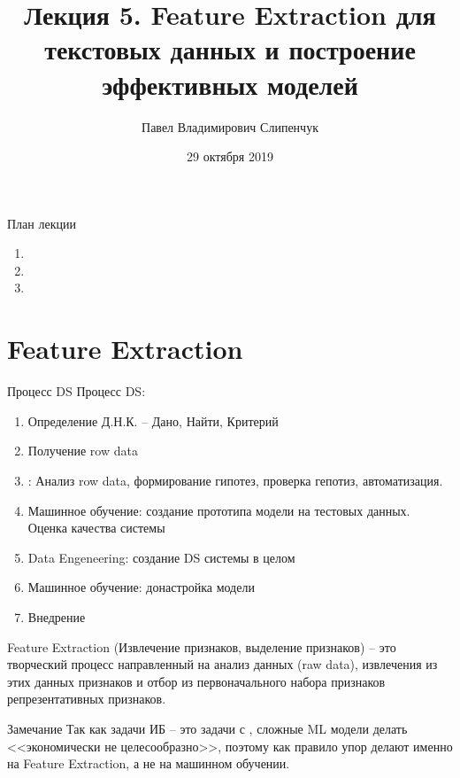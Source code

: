 


\title{Лекция 5. Feature Extraction для текстовых данных и построение эффективных моделей}

\date{29 октября 2019}
\author{Павел Владимирович Слипенчук }


  \maketitle
    
\begin{frame}{План лекции}
    \begin{enumerate}
    	\item {}
		\item {}
		\item {}
	\end{enumerate}
\end{frame}

\section{Feature Extraction}\label{section:fe}

\begin{frame}{Процесс DS}
	Процесс DS:
	\begin{enumerate}
		\item Определение Д.Н.К. -- Дано, Найти, Критерий
		\item Получение row data
		\item {}: Анализ row data, формирование гипотез, проверка гепотиз, автоматизация.
		\item Машинное обучение: создание прототипа модели на тестовых данных. Оценка качества системы
		\item Data Engeneering: создание DS системы в целом
		\item Машинное обучение: донастройка модели
		\item Внедрение
	\end{enumerate}
\end{frame}

\begin{frame}{Feature Extraction}
	(Извлечение признаков, выделение признаков) 
	-- это творческий процесс
	направленный на анализ данных (raw data),
	извлечения из этих данных признаков
	и отбор из первоначального набора признаков 
	репрезентативных признаков.
	
	\begin{block}{Замечание}
	Так как задачи ИБ -- это задачи с ,
	сложные ML модели делать <<экономически не целесообразно>>,
	поэтому как правило упор делают именно на Feature Extraction,
	а не на машинном обучении.
	\end{block}
\end{frame}

